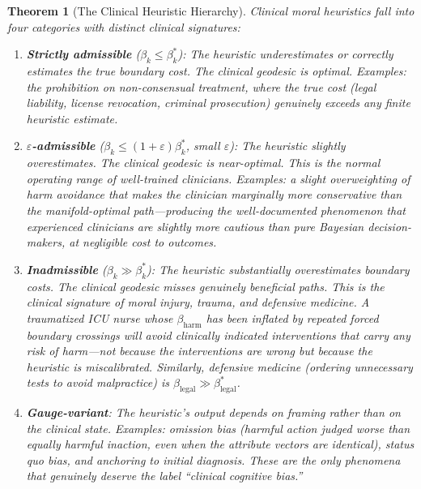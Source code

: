\documentclass[12pt]{article}
\newtheorem{theorem}{Theorem}[section]
\theoremstyle{definition}
\theoremstyle{remark}
\begin{document}
\begin{theorem}[The Clinical Heuristic Hierarchy]
\label{thm:clinical_hierarchy}
Clinical moral heuristics fall into four categories with distinct clinical signatures:
\begin{enumerate}
    \item \textbf{Strictly admissible} ($\beta_k \leq \beta_k^*$): The heuristic underestimates or correctly estimates the true boundary cost.  The clinical geodesic is optimal.  Examples: the prohibition on non-consensual treatment, where the true cost (legal liability, license revocation, criminal prosecution) genuinely exceeds any finite heuristic estimate.
    \item \textbf{$\varepsilon$-admissible} ($\beta_k \leq (1+\varepsilon)\beta_k^*$, small $\varepsilon$): The heuristic slightly overestimates.  The clinical geodesic is near-optimal.  This is the \emph{normal operating range} of well-trained clinicians.  Examples: a slight overweighting of harm avoidance that makes the clinician marginally more conservative than the manifold-optimal path---producing the well-documented phenomenon that experienced clinicians are slightly more cautious than pure Bayesian decision-makers, at negligible cost to outcomes.
    \item \textbf{Inadmissible} ($\beta_k \gg \beta_k^*$): The heuristic substantially overestimates boundary costs.  The clinical geodesic misses genuinely beneficial paths.  \emph{This is the clinical signature of moral injury, trauma, and defensive medicine.}  A traumatized ICU nurse whose $\beta_{\text{harm}}$ has been inflated by repeated forced boundary crossings will avoid clinically indicated interventions that carry any risk of harm---not because the interventions are wrong but because the heuristic is miscalibrated.  Similarly, defensive medicine (ordering unnecessary tests to avoid malpractice) is $\beta_{\text{legal}} \gg \beta_{\text{legal}}^*$.
    \item \textbf{Gauge-variant}: The heuristic's output depends on framing rather than on the clinical state.  Examples: omission bias (harmful action judged worse than equally harmful inaction, even when the attribute vectors are identical), status quo bias, and anchoring to initial diagnosis.  These are the only phenomena that genuinely deserve the label ``clinical cognitive bias.''
\end{enumerate}
\end{theorem}
\end{document}
